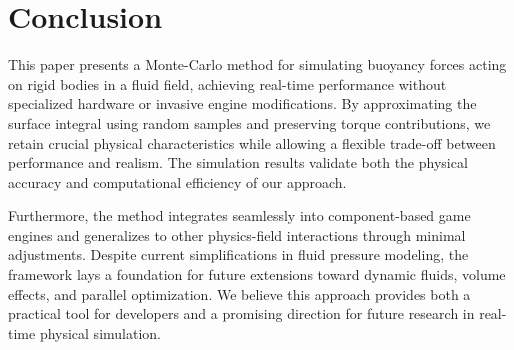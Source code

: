 \section{Conclusion}

This paper presents a Monte-Carlo method for simulating buoyancy forces acting on rigid bodies in a fluid field, achieving real-time performance without specialized hardware or invasive engine modifications.
By approximating the surface integral using random samples and preserving torque contributions, we retain crucial physical characteristics while allowing a flexible trade-off between performance and realism.
The simulation results validate both the physical accuracy and computational efficiency of our approach.

Furthermore, the method integrates seamlessly into component-based game engines and generalizes to other physics-field interactions through minimal adjustments.
Despite current simplifications in fluid pressure modeling, the framework lays a foundation for future extensions toward dynamic fluids, volume effects, and parallel optimization.
We believe this approach provides both a practical tool for developers and a promising direction for future research in real-time physical simulation.